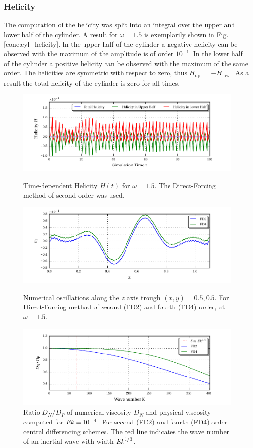 \subsubsection{Helicity}

The computation of the helicity was split into an integral over the upper and lower half
of the cylinder.  A result for $\omega=1.5$ is exemplarily shown in Fig. \ref{cone:cyl_helicity}.
In the upper half of the cylinder a negative helicity can be observed with the maximum of the amplitude is of order $10^{-1}$.
In the lower half of the cylinder a positive helicity can be observed with the maximum of the same order.
The helicities are symmetric with respect to zero, thus $H_{\text{up.}} = -H_{\text{low.}}$.
As a result the total helicity of the cylinder is zero for all times.

\begin{figure}[!p]
  \centering
  \includegraphics{gfx/cone/cylinder/helicity.pdf}  \caption{
      Time-dependent Helicity $H(t)$ for $\omega=1.5$. The Direct-Forcing method of second order was used.
      \label{cone:cyl_helicity}
      }
  \centering
  \includegraphics{gfx/cone/cylinder/oscillations.pdf}  \caption{
      Numerical oscillations along the $z$ axis trough $(x,y) = 0.5, 0.5$.
      For Direct-Forcing method of second (FD2) and fourth (FD4) order, at $\omega=1.5$.
      \label{cone:cyl_oscillations}
      }
  \centering
  \includegraphics{gfx/cone/cylinder/numvis.pdf}  \caption{
      Ratio $D_N/D_P$ of  numerical viscosity  $D_N$ and physical viscosity computed for $\mbox{\textit{Ek}}=10^{-4}$. For second (FD2) and fourth (FD4) order central differencing schemes.
      The red line indicates the wave number of an inertial wave with width $\mbox{\textit{Ek}}^{1/3}$.
      \label{cone:cyl_numvis}
      }
\end{figure}

